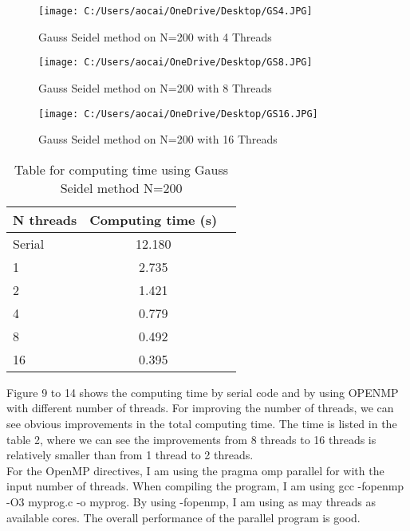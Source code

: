 \documentclass[12pt]{article}
\begin{document}
\begin{figure}[H]
	\centering
	\texttt{[image: C:/Users/aocai/OneDrive/Desktop/GS4.JPG]}
	\caption[Optional caption]{Gauss Seidel method on N=200 with 4 Threads}
	\label{fig:GS4}
\end{figure}

\begin{figure}[H]
	\centering
	\texttt{[image: C:/Users/aocai/OneDrive/Desktop/GS8.JPG]}
	\caption[Optional caption]{Gauss Seidel method on N=200 with 8 Threads}
	\label{fig:GS8}
\end{figure}
\begin{figure}[H]
	\centering
	\texttt{[image: C:/Users/aocai/OneDrive/Desktop/GS16.JPG]}
	\caption[Optional caption]{Gauss Seidel method on N=200 with 16 Threads}
	\label{fig:GS16}
\end{figure}

\begin{table}[H]
	\centering
	\label{tab:gs}
	\begin{tabular}{lcr}
	\bfseries N {threads} & Computing time (s)\\ \hline
	Serial & 12.180\\
	1 & 2.735\\
	2 & 1.421\\
	4 & 0.779\\
	8 & 0.492\\
	16 & 0.395\\
	\end{tabular}
	\caption[This is optional caption, without reference]{Table for computing time using Gauss Seidel method N=200}
\end{table}
Figure 9 to 14 shows the computing time by serial code and by using OPENMP with different number of threads. For improving the number of threads, we can see obvious improvements in the total computing time. The time is listed in the table 2, where we can see the improvements from 8 threads to 16 threads is relatively smaller than from 1 thread to 2 threads.\\

For the OpenMP directives, I am using the pragma omp parallel for with the input number of threads. When compiling the program, I am using gcc -fopenmp -O3 myprog.c -o myprog. By using -fopenmp, I am using as may threads as available cores. The overall performance of the parallel program is good.
\end{document}
